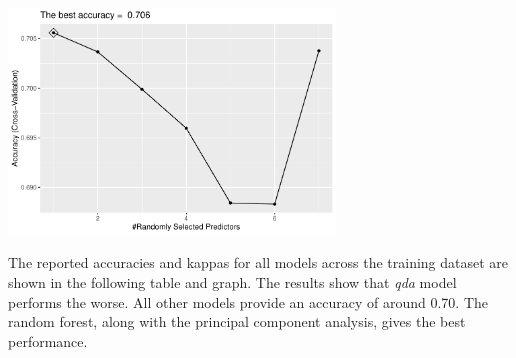 \documentclass[]{article}
\newenvironment{Shaded}{\begin{snugshade}}{\end{snugshade}}
\newcommand{\CommentTok}[1]{\textcolor[rgb]{0.56,0.35,0.01}{\textit{#1}}}
\newcommand{\DataTypeTok}[1]{\textcolor[rgb]{0.13,0.29,0.53}{#1}}
\newcommand{\DecValTok}[1]{\textcolor[rgb]{0.00,0.00,0.81}{#1}}
\newcommand{\KeywordTok}[1]{\textcolor[rgb]{0.13,0.29,0.53}{\textbf{#1}}}
\newcommand{\NormalTok}[1]{#1}
\newcommand{\OperatorTok}[1]{\textcolor[rgb]{0.81,0.36,0.00}{\textbf{#1}}}
\newcommand{\OtherTok}[1]{\textcolor[rgb]{0.56,0.35,0.01}{#1}}
\newcommand{\StringTok}[1]{\textcolor[rgb]{0.31,0.60,0.02}{#1}}
\begin{document}
\begin{Shaded}
\end{Shaded}

\begin{center}
\includegraphics[width=0.65\textwidth]{LiverDisease_files/figure-latex/unnamed-chunk-35-1.pdf}
\end{center}

\begin{Shaded}
\end{Shaded}

The reported accuracies and kappas for all models across the training
dataset are shown in the following table and graph. The results show
that \emph{qda} model performs the worse. All other models provide an
accuracy of around 0.70. The random forest, along with the principal
component analysis, gives the best performance.
\end{document}
